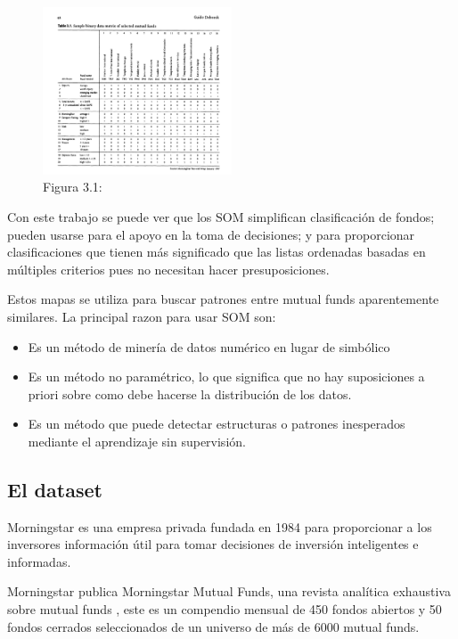 \documentclass[fleqn, journal, onecolumn]{IEEEtran}             %
\newcommand \Quote              {\qq}                           %
\theoremstyle{break}                                            %
\begin{document}
      \begin{figure}
        \centering
        \includegraphics[width=0.5\textwidth]{Table3}
        \caption{Figura 3.1: \cite{Visual}}
      \end{figure}
      
      Con este trabajo se puede ver que los SOM simplifican clasificación de fondos;
      pueden usarse para el apoyo en la toma de decisiones; y para proporcionar
      clasificaciones que tienen más significado que las listas ordenadas basadas en múltiples
      criterios pues no necesitan hacer presuposiciones.

      Estos mapas se utiliza para buscar patrones entre mutual funds aparentemente similares. 
      La principal razon para usar SOM son:
      \begin{itemize}
        \item Es un método de minería de datos numérico en lugar de simbólico
        \item Es un método no paramétrico, lo que significa que no hay suposiciones a priori sobre
          como debe hacerse la distribución de los datos.
        \item Es un método que puede detectar estructuras o patrones inesperados mediante el aprendizaje
        sin supervisión.
      \end{itemize}

      \subsection{El dataset}

        Morningstar es una empresa privada fundada en 1984 para proporcionar a los inversores 
        información útil para tomar decisiones de inversión inteligentes e informadas. 
        
        Morningstar publica Morningstar Mutual Funds, una revista analítica exhaustiva sobre 
        mutual funds \Quote{Morningstar Investor}, este es un compendio mensual de 450 fondos abiertos
        y 50 fondos cerrados seleccionados de un universo de más de 6000 mutual funds. 
         
\end{document}
